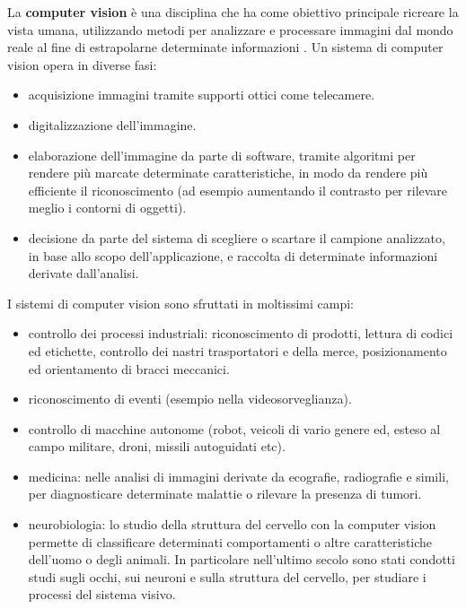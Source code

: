 La \textbf{computer vision} è una disciplina che ha come obiettivo principale ricreare la vista umana, utilizzando metodi per analizzare e processare immagini dal mondo reale al fine di estrapolarne determinate informazioni \cite{vision,vision2}. Un sistema di computer vision opera in diverse fasi:
\begin{itemize}
\item acquisizione immagini tramite supporti ottici come telecamere.
\item digitalizzazione dell'immagine.
\item elaborazione dell'immagine da parte di software, tramite algoritmi per rendere più marcate determinate caratteristiche, in modo da rendere più efficiente il riconoscimento (ad esempio aumentando il contrasto per rilevare meglio i contorni di oggetti).
\item decisione da parte del sistema di scegliere o scartare il campione analizzato, in base allo scopo dell'applicazione, e raccolta di determinate informazioni derivate dall'analisi.
\end{itemize}
I sistemi di computer vision sono sfruttati in moltissimi campi:

\begin{itemize}
\item controllo dei processi industriali: riconoscimento di prodotti, lettura di codici ed etichette, controllo dei nastri trasportatori e della merce, posizionamento ed orientamento di bracci meccanici.
\item riconoscimento di eventi (esempio nella videosorveglianza).

\item controllo di macchine autonome (robot, veicoli di vario genere ed, esteso al campo militare, droni, missili autoguidati etc).

\item medicina: nelle analisi di immagini derivate da ecografie, radiografie e simili, per diagnosticare determinate malattie o rilevare la presenza di tumori.

\item neurobiologia: lo studio della struttura del cervello con la computer vision permette di classificare determinati comportamenti o altre caratteristiche dell'uomo o degli animali.
In particolare nell'ultimo secolo sono stati condotti studi sugli occhi, sui neuroni e sulla struttura del cervello, per studiare i processi del sistema visivo. 

\end{itemize}

